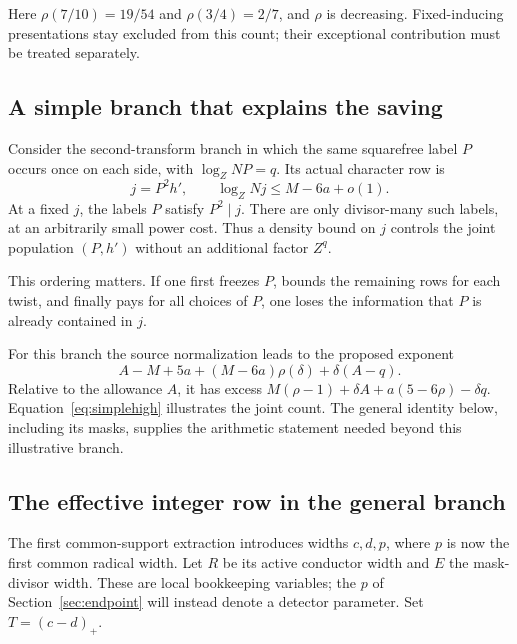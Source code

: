 \documentclass[11pt]{article}
\theoremstyle{definition}
\begin{document}
Here $\rho(7/10)=19/54$ and $\rho(3/4)=2/7$, and $\rho$ is decreasing.
Fixed-inducing presentations stay excluded from this count; their
exceptional contribution must be treated separately.

\subsection{A simple branch that explains the saving}
Consider the second-transform branch in which the same squarefree label
$P$ occurs once on each side, with $\log_Z NP=q$. Its actual character
row is
\[
 j=P^2h',\qquad \log_Z Nj\le M-6a+o(1).
\]
At a fixed $j$, the labels $P$ satisfy $P^2\mid j$. There are only
divisor-many such labels, at an arbitrarily small power cost. Thus a
density bound on $j$ controls the joint population $(P,h')$ without
an additional factor $Z^q$.

This ordering matters. If one first freezes $P$, bounds the remaining
rows for each twist, and finally pays for all choices of $P$, one loses
the information that $P$ is already contained in $j$.

For this branch the source normalization leads to the proposed exponent
\begin{equation}\label{eq:simplehigh}
 A-M+5a+(M-6a)\rho(\delta)+\delta(A-q).
\end{equation}
Relative to the allowance $A$, it has excess
$M(\rho-1)+\delta A+a(5-6\rho)-\delta q$.
Equation~\eqref{eq:simplehigh} illustrates the joint count. The general
identity below, including its masks, supplies the arithmetic statement
needed beyond this illustrative branch.

\subsection{The effective integer row in the general branch}
The first common-support extraction introduces widths $c,d,p$, where
$p$ is now the first common radical width. Let $R$ be its active
conductor width and $E$ the mask-divisor width. These are local
bookkeeping variables; the $p$ of Section~\ref{sec:endpoint} will instead
denote a detector parameter. Set $T=(c-d)_+$.
\end{document}
